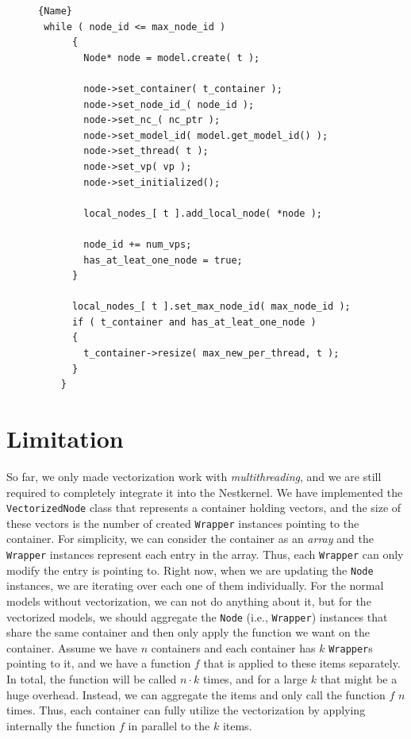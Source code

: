 \begin{figure}
\begin{lstlisting}[caption=Creating nodes,frame=tlrb, label=lst:creating_nodes_while]{Name}
 while ( node_id <= max_node_id )
      {
        Node* node = model.create( t );

        node->set_container( t_container );
        node->set_node_id_( node_id );
        node->set_nc_( nc_ptr );
        node->set_model_id( model.get_model_id() );
        node->set_thread( t );
        node->set_vp( vp );
        node->set_initialized();

        local_nodes_[ t ].add_local_node( *node );

        node_id += num_vps;
        has_at_leat_one_node = true;
      }

      local_nodes_[ t ].set_max_node_id( max_node_id );
      if ( t_container and has_at_leat_one_node )
      {
        t_container->resize( max_new_per_thread, t );
      }
    }
\end{lstlisting}
\end{figure}

\section{Limitation}

So far, we only made vectorization work with \emph{multithreading}, and we are still required to completely integrate it into the Nestkernel. We have implemented the \texttt{VectorizedNode} class that represents a container holding vectors, and the size of these vectors is the number of created \texttt{Wrapper} instances pointing to the container. For simplicity, we can consider the container as an \emph{array} and the \texttt{Wrapper} instances represent each entry in the array. Thus, each \texttt{Wrapper} can only modify the entry is pointing to. Right now, when we are updating the \texttt{Node} instances, we are iterating over each one of them individually. For the normal models without vectorization, we can not do anything about it, but for the vectorized models, we should aggregate the \texttt{Node} (i.e., \texttt{Wrapper}) instances that share the same container and then only apply the function we want on the container. Assume we have $n$ containers and each container has $k$ \texttt{Wrapper}s pointing to it, and we have a function $f$ that is applied to these items separately. In total, the function will be called $n\cdot k$ times, and for a large $k$ that might be a huge overhead. Instead, we can aggregate the items and only call the function $f$ $n$ times. Thus, each container can fully utilize the vectorization by applying internally the function $f$ in parallel to the $k$ items.


